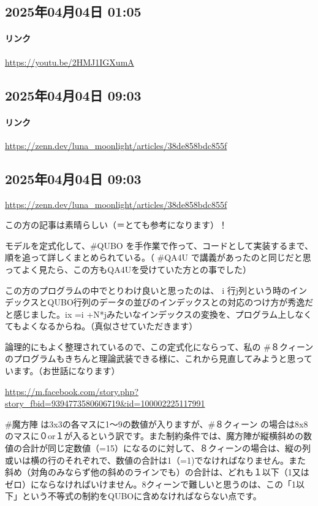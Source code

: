 \subsection*{2025年04月04日 01:05}

\paragraph{リンク}
\url{https://youtu.be/2HMJ1IGXumA}

\subsection*{2025年04月04日 09:03}

\paragraph{リンク}
\url{https://zenn.dev/luna_moonlight/articles/38de858bdc855f}

\subsection*{2025年04月04日 09:03}

\url{https://zenn.dev/luna_moonlight/articles/38de858bdc855f}

この方の記事は素晴らしい（＝とても参考になります）！

モデルを定式化して、\#QUBO を手作業で作って、コードとして実装するまで、順を追って詳しくまとめられている。（ \#QA4U で講義があったのと同じだと思ってよく見たら、この方もQA4Uを受けていた方との事でした）

この方のプログラムの中でとりわけ良いと思ったのは、 i 行j列という時のインデックスとQUBO行列のデータの並びのインデックスとの対応のつけ方が秀逸だと感じました。ix =i +N*jみたいなインデックスの変換を、プログラム上しなくてもよくなるからね。（真似させていただきます）

論理的にもよく整理されているので、この定式化にならって、私の \#８クィーン のプログラムもきちんと理論武装できる様に、これから見直してみようと思っています。（お世話になります）

\url{https://m.facebook.com/story.php?story_fbid=9394773580606719&id=100002225117991}

\#魔方陣 は3x3の各マスに1〜9の数値が入りますが、\#８クィーン の場合は8x8のマスに０or１が入るという訳です。また制約条件では、魔方陣が縦横斜めの数値の合計が同じ定数値（=15）になるのに対して、８クィーンの場合は、縦の列或いは横の行のそれぞれで、数値の合計は1（=1)でなければなりません。また斜め（対角のみならず他の斜めのラインでも）の合計は、どれも１以下（1又はゼロ）にならなければいけません。8クィーンで難しいと思うのは、この「1以下」という不等式の制約をQUBOに含めなければならない点です。

